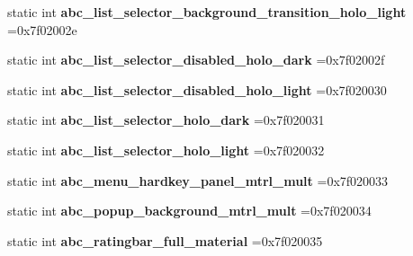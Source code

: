 \begin{DoxyCompactItemize}
\mbox{\label{classandroid_1_1support_1_1v4_1_1R_1_1drawable_a672e14d31a75d5710fc1a83b98c04196}} 
static int {\bfseries abc\+\_\+list\+\_\+selector\+\_\+background\+\_\+transition\+\_\+holo\+\_\+light} =0x7f02002e
\item 
\mbox{\label{classandroid_1_1support_1_1v4_1_1R_1_1drawable_a7f9a947b90313e398141253e1c6605b3}} 
static int {\bfseries abc\+\_\+list\+\_\+selector\+\_\+disabled\+\_\+holo\+\_\+dark} =0x7f02002f
\item 
\mbox{\label{classandroid_1_1support_1_1v4_1_1R_1_1drawable_a3019496d4cf352fc6182ddf1bf11e940}} 
static int {\bfseries abc\+\_\+list\+\_\+selector\+\_\+disabled\+\_\+holo\+\_\+light} =0x7f020030
\item 
\mbox{\label{classandroid_1_1support_1_1v4_1_1R_1_1drawable_a0854185817c9b3bbe1fbd51c3c1afd92}} 
static int {\bfseries abc\+\_\+list\+\_\+selector\+\_\+holo\+\_\+dark} =0x7f020031
\item 
\mbox{\label{classandroid_1_1support_1_1v4_1_1R_1_1drawable_a937e6e5c5955b54fefeff08ef549ac17}} 
static int {\bfseries abc\+\_\+list\+\_\+selector\+\_\+holo\+\_\+light} =0x7f020032
\item 
\mbox{\label{classandroid_1_1support_1_1v4_1_1R_1_1drawable_a242bf2e1212849d6c9e3102621d37d83}} 
static int {\bfseries abc\+\_\+menu\+\_\+hardkey\+\_\+panel\+\_\+mtrl\+\_\+mult} =0x7f020033
\item 
\mbox{\label{classandroid_1_1support_1_1v4_1_1R_1_1drawable_a3c397716f49b2dd85a026404b14ba784}} 
static int {\bfseries abc\+\_\+popup\+\_\+background\+\_\+mtrl\+\_\+mult} =0x7f020034
\item 
\mbox{\label{classandroid_1_1support_1_1v4_1_1R_1_1drawable_abb2ecb62e91eabedcdd073d82bcbe468}} 
static int {\bfseries abc\+\_\+ratingbar\+\_\+full\+\_\+material} =0x7f020035
\item 

\end{DoxyCompactItemize}
